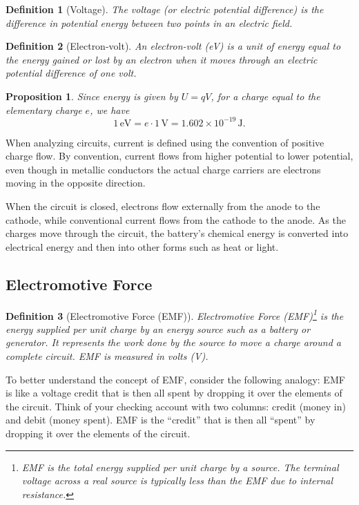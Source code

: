 \documentclass{article}
\newtheorem{definition}{Definition}
\newtheorem{proposition}{Proposition}
\begin{document}
\begin{definition}[Voltage]
    The voltage (or electric potential difference) is the difference in potential energy between two points in an electric field.
\end{definition}

\begin{definition}[Electron-volt]
    An electron-volt (eV) is a unit of energy equal to the energy gained or lost by an electron when it moves through an electric potential difference of one volt.
\end{definition}
\begin{proposition}
    Since energy is given by $U = qV$, for a charge equal to the elementary charge $e$, we have
    \[1\,\text{eV} = e \cdot 1\,\text{V} = 1.602 \times 10^{-19}\,\text{J}.\]
\end{proposition}

When analyzing circuits, current is defined using the convention of positive charge flow. By convention, current flows from higher potential to lower potential, even though in metallic conductors the actual charge carriers are electrons moving in the opposite direction.

When the circuit is closed, electrons flow externally from the anode to the cathode, while conventional current flows from the cathode to the anode. As the charges move through the circuit, the battery's chemical energy is converted into electrical energy and then into other forms such as heat or light.

\subsection{Electromotive Force}

\begin{definition}[Electromotive Force (EMF)]
    Electromotive Force (EMF)\footnote{EMF is the total energy supplied per unit charge by a source. The terminal voltage across a real source is typically less than the EMF due to internal resistance.} is the energy supplied per unit charge by an energy source such as a battery or generator. It represents the work done by the source to move a charge around a complete circuit. EMF is measured in volts (V).
\end{definition}

To better understand the concept of EMF, consider the following analogy: EMF is like a voltage credit that is then all spent by dropping it over the elements of the circuit. Think of your checking account with two columns: credit (money in) and debit (money spent). EMF is the ``credit'' that is then all ``spent'' by dropping it over the elements of the circuit.
\end{document}
